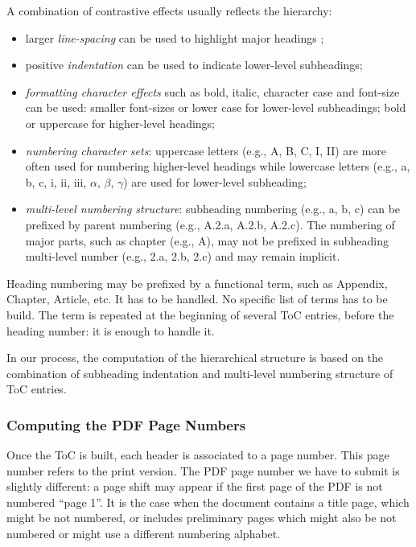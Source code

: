 A combination of contrastive effects usually reflects the hierarchy:
\begin{itemize}
    \item larger \emph{line-spacing} can be used to highlight major headings ;
    \item positive \emph{indentation} can be used to indicate lower-level subheadings;
    \item \emph{formatting character effects} such as bold, italic, character case and font-size can be used: smaller font-sizes or lower case for lower-level subheadings; bold or uppercase for higher-level headings;
    \item \emph{numbering character sets}: uppercase letters (e.g., A, B, C, I, II)  are more often used for numbering higher-level headings while lowercase letters (e.g., a, b, c, i, ii, iii, $\alpha$, $\beta$, $\gamma$) are used for lower-level subheading;
    \item \emph{multi-level numbering structure}: subheading numbering (e.g., a, b, c) can be prefixed by parent numbering (e.g., A.2.a, A.2.b, A.2.c). The numbering of major parts, such as chapter (e.g., A), may not be prefixed in subheading multi-level number (e.g., 2.a, 2.b, 2.c) and may remain implicit.
\end{itemize}
 
Heading numbering may be prefixed by a functional term, such as Appendix, Chapter, Article, etc. It has to be handled. No specific list of terms has to be build. The term is repeated at the beginning of several ToC entries, before the heading number: it is enough to handle it.

In our process, the computation of the hierarchical structure is based on the combination of subheading indentation and multi-level numbering structure of ToC entries.

\subsubsection{Computing the PDF Page Numbers}

Once the ToC is built, each header is associated to a page
number. This page number refers to the print version. The PDF page
number we have to submit is slightly different: a page shift may
appear if the first page of the PDF is not numbered ``page 1''. It is the
case when the document contains a title page, which might be not
numbered, or includes preliminary pages which might also be not numbered or might
use a different numbering alphabet.

